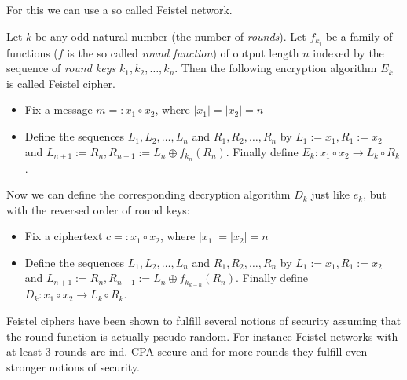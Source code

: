 For this we can use a so called Feistel network.
\begin{definition}
 Let $k$ be any odd natural number (the number of \emph{rounds}). Let $f_{k_i}$ be a family of functions ($f$ is the so called \emph{round function}) of output length $n$ indexed by the sequence of \emph{round keys} $k_1, k_2, \ldots, k_n$. Then the following encryption algorithm $E_k$ is called Feistel cipher. %
 \begin{itemize}
  \item Fix a message $m=:x_1\circ x_2$, where $\left|x_1\right|=\left|x_2\right|=n$
  \item Define the sequences $L_1, L_2, \ldots, L_n$ and $R_1, R_2, \ldots, R_n$ by $L_1:=x_1, R_1:=x_2$ and $L_{n+1}:=R_n, R_{n+1}:=L_n\oplus f_{k_n}(R_n)$. Finally define $E_k:x_1\circ x_2\to L_k\circ R_k$. 
 \end{itemize}
 Now we can define the corresponding decryption algorithm $D_k$ just like $e_k$, but with the reversed order of round keys:
 \begin{itemize}
 	\item Fix a ciphertext $c=:x_1\circ x_2$, where $\left|x_1\right|=\left|x_2\right|=n$
 	\item Define the sequences $L_1, L_2, \ldots, L_n$ and $R_1, R_2, \ldots, R_n$ by $L_1:=x_1, R_1:=x_2$ and $L_{n+1}:=R_n, R_{n+1}:=L_n\oplus f_{k_{k-n}}(R_n)$. Finally define $D_k:x_1\circ x_2\to L_k\circ R_k$. 
 \end{itemize}
\end{definition}
Feistel ciphers have been shown to fulfill several notions of security assuming that the round function is actually pseudo random. For instance Feistel networks with at least $3$ rounds are ind. CPA secure and for more rounds they fulfill even stronger notions of security. 

